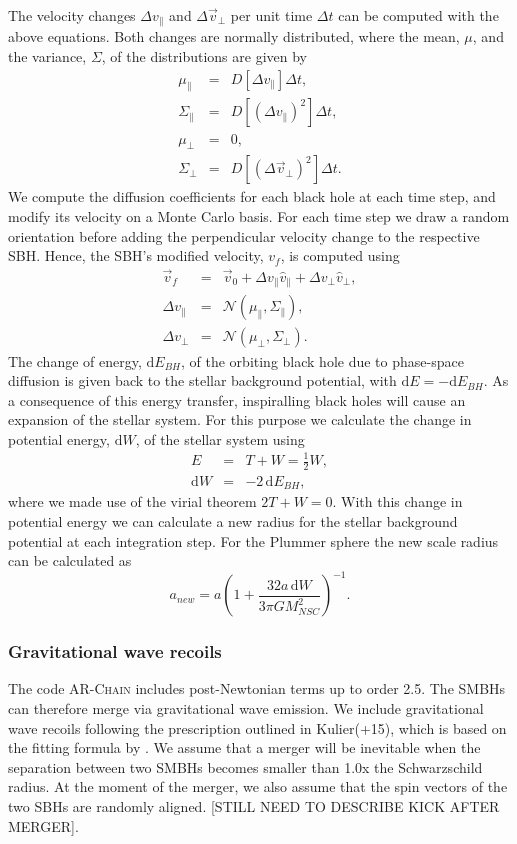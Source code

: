 \documentclass[english, backref,breaklinks,colorlinks,citecolor=blue, usenatbib]{mnras}
\begin{document}
The velocity changes $\Delta v_\parallel$ and $\Delta\vec{v}_\bot$ per unit time $\Delta t$ can be computed with the above equations. Both changes are normally distributed, where the mean, $\mu$, and the variance, $\Sigma$, of the distributions are given by
\begin{eqnarray}
\mu_\parallel &=& D[\Delta v_\parallel]\Delta t,\\
\Sigma_\parallel &=& D[(\Delta v_\parallel)^2]\Delta t,\\
\mu_\bot &=& 0,\\
\Sigma_\bot &=& D[(\Delta \vec{v}_\bot)^2]\Delta t.
\end{eqnarray}
We compute the diffusion coefficients for each black hole at each time step, and modify its velocity on a Monte Carlo basis. For each time step we draw a random orientation before adding the perpendicular velocity change to the respective SBH. Hence, the SBH's modified velocity, $v_f$, is computed using
\begin{eqnarray}
\vec{v}_f &=& \vec{v}_0 + \Delta v_\parallel \hat{v}_\parallel + \Delta v_\bot \hat{v}_\bot,\\
\Delta v_\parallel &=& \mathcal{N}(\mu_\parallel, \Sigma_\parallel),\\
\Delta v_\bot &=& \mathcal{N}(\mu_\bot, \Sigma_\bot).
\end{eqnarray}
The change of energy, $\mbox{d}E_{BH}$, of the orbiting black hole due to phase-space diffusion is given back to the stellar background potential, with $\mbox{d}E = -\mbox{d}E_{BH}$. As a consequence of this energy transfer, inspiralling black holes will cause an expansion of the stellar system. For this purpose we calculate the change in potential energy, $\mbox{d}W$, of the stellar system using
\begin{eqnarray}
E &=& T + W = \frac{1}{2}W,\\
\mbox{d}W &=& -2\,\mbox{d}E_{BH},
\end{eqnarray}
where we made use of the virial theorem $2T+W =0$. With this change in potential energy we can calculate a new radius for the stellar background potential at each integration step. For the Plummer sphere the new scale radius can be calculated as
\begin{equation}
a_{new} = a\left(1+\frac{32a\,\mbox{d}W}{3\pi GM_{NSC}^2}\right)^{-1}.
\end{equation}

\subsubsection{Gravitational wave recoils}
The code \textsc{AR-Chain} includes post-Newtonian terms up to order 2.5. The SMBHs can therefore merge via gravitational wave emission. We include gravitational wave recoils following the prescription outlined in Kulier(+15), which is based on the fitting formula by \citet{2012PhRvD..85h4015L}.  We assume that a merger will be inevitable when the separation between two SMBHs becomes smaller than 1.0x the Schwarzschild radius. At the moment of the merger, we also assume that the spin vectors of the two SBHs are randomly aligned. [STILL NEED TO DESCRIBE KICK AFTER MERGER].
\end{document}
